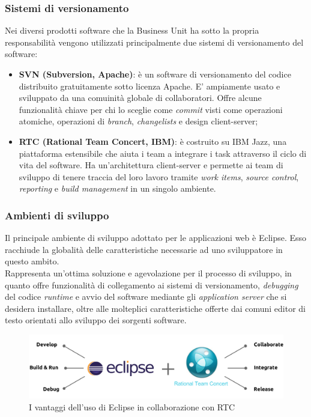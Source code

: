 	\subsubsection{Sistemi di versionamento}
	\label{sistemi-versionamento}
	Nei diversi prodotti software che la Business Unit ha sotto la propria responsabilità vengono utilizzati principalmente due sistemi di versionamento del software: 
	\begin{itemize}
		\item \textbf{SVN (Subversion, Apache)}: è un software di versionamento del codice distribuito gratuitamente sotto licenza Apache. E' ampiamente usato e sviluppato da una comuinità	globale di collaboratori. Offre alcune funzionalità chiave per chi lo sceglie come \textit{commit} visti come operazioni atomiche, operazioni di \textit{branch}, \textit{changelists} e design client-server;
		\item \textbf{RTC (Rational Team Concert, IBM)}: è costruito su IBM Jazz, una piattaforma estensibile che aiuta i team a integrare i task attraverso il ciclo di vita del software.	Ha un'architettura client-server e permette ai team di sviluppo di tenere traccia del loro lavoro tramite \textit{work items}, \textit{source control}, \textit{reporting} e \textit{build management} in un singolo ambiente.
	\end{itemize}
	
	\subsubsection{Ambienti di sviluppo}
	Il principale ambiente di sviluppo adottato per le applicazioni web è Eclipse. Esso racchiude la globalità delle caratteristiche necessarie ad uno sviluppatore in questo ambito.\\	
	
	Rappresenta un'ottima soluzione e agevolazione per il processo di sviluppo, in quanto offre funzionalità di collegamento ai sistemi di versionamento, \textit{debugging} del codice \textit{runtime} e avvio del software mediante gli \textit{application server} che si desidera installare, oltre alle molteplici caratteristiche offerte dai comuni editor di testo orientati allo sviluppo dei sorgenti software.
	
	\begin{figure}[H]
		\centering
	   	\includegraphics[width=1\textwidth]{immagini/ambienti_sviluppo}
	   	\caption{I vantaggi dell'uso di Eclipse in collaborazione con RTC}
	\end{figure}
	
